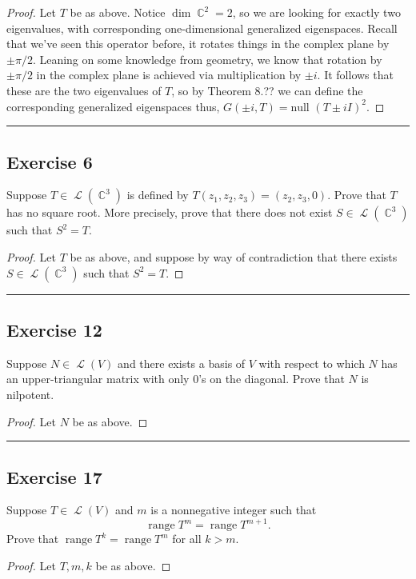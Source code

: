 \documentclass[letterpaper, 12pt]{amsart}
\DeclareMathOperator{\C}{\mathbb{C}}				%
\DeclareMathOperator{\Ell}{\mathscr{L}}				%
\renewcommand{\null}{\text{null }}					%
\DeclareMathOperator{\range}{\text{range }}			%
\theoremstyle{definition}  							%
\begin{document}
		\begin{proof}
		Let $T$ be as above.
		Notice $\dim \C^2 = 2$, so we are looking for exactly two eigenvalues, with corresponding one-dimensional generalized eigenspaces.
		Recall that we've seen this operator before, it rotates things in the complex plane by $\pm\pi/2$.
		Leaning on some knowledge from geometry, we know that rotation by $\pm\pi/2$ in the complex plane is achieved via multiplication by $\pm i$.
		It follows that these are the two eigenvalues of $T$, so by \color{red}Theorem 8.?? \color{black}we can define the corresponding generalized eigenspaces thus, $G(\pm i,T) = \null(T \pm iI)^2$.			
		\end{proof}
		\vspace*{2mm}
		\hrule
		\vspace*{2mm}

		\subsection*{Exercise 6}
		Suppose $T \in \Ell(\C^3)$ is defined by $T(z_{1}, z_{2}, z_{3}) = (z_{2},z_{3},0)$. 
		Prove that $T$ has no square root. 
		More precisely, prove that there does not exist $S \in \Ell(\C^3)$ such that $S^2=T$.

		\begin{proof}
		Let $T$ be as above, and suppose by way of contradiction that there exists $S \in \Ell(\C^3)$ such that $S^2=T$.
		\end{proof}
		\vspace*{2mm}
		\hrule
		\vspace*{2mm}

		\subsection*{Exercise 12}
		Suppose $N \in \Ell(V)$ and there exists a basis of $V$ with respect to which $N$ has an upper-triangular matrix with only $0$'s on the diagonal. 
		Prove that $N$ is nilpotent.

		\begin{proof}
		Let $N$ be as above.
		\end{proof}
		\vspace*{2mm}
		\hrule
		\vspace*{2mm}

		\subsection*{Exercise 17}
		Suppose $T \in \Ell(V)$ and $m$ is a nonnegative integer such that $$\range T^{m} = \range T^{m+1}.$$
		Prove that $\range T^k = \range T^m$ for all $k > m$.

		\begin{proof}
		Let $T,m,k$ be as above.
		\end{proof}
\end{document}
